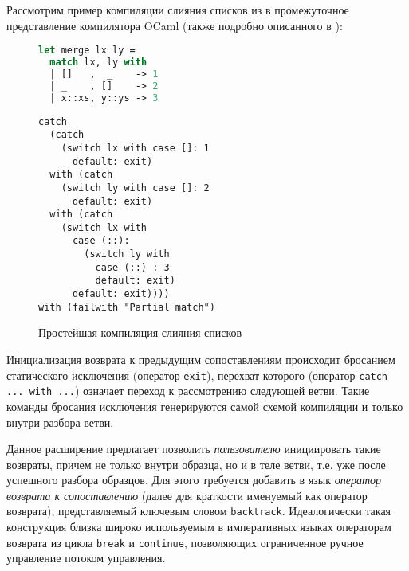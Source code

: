 Рассмотрим пример компиляции слияния списков из \cite{fessant2001optimizing} в промежуточное представление компилятора OCaml (также подробно описанного в \cite{fessant2001optimizing}):

\noindent
\begin{minipage}{\textwidth}
  \begin{figure}[H]
    \begin{minipage}{0.40\textwidth}
\begin{lstlisting}[language=ocaml]
let merge lx ly = 
  match lx, ly with
  | []   ,  _    -> 1
  | _    , []    -> 2
  | x::xs, y::ys -> 3
\end{lstlisting}
    \end{minipage}
  \centering
    \begin{minipage}{0.55\textwidth}
\begin{lstlisting}[language=lambda]
catch
  (catch
    (switch lx with case []: 1
      default: exit)
  with (catch
    (switch ly with case []: 2
      default: exit)
  with (catch
    (switch lx with
      case (::):
        (switch ly with
          case (::) : 3
          default: exit)
      default: exit))))
with (failwith "Partial match")
\end{lstlisting}
    \end{minipage}
    
  \captionsetup{justification=centering}
  \caption{Простейшая компиляция слияния списков}
  \label{fig:simple_match}
  \end{figure}
\end{minipage}

\bigskip

Инициализация возврата к предыдущим сопоставлениям происходит бросанием статического исключения (оператор \lstinline|exit|), перехват которого (оператор \lstinline[language=none,breaklines]|catch ... with ...|) означает переход к рассмотрению следующей ветви. Такие команды бросания исключения генерируются самой схемой компиляции и только внутри разбора ветви.

Данное расширение предлагает позволить \textit{пользователю} инициировать такие возвраты, причем не только внутри образца, но и в теле ветви, т.е. уже после успешного разбора образцов. Для этого требуется добавить в язык \textit{оператор возврата к сопоставлению} (далее для краткости именуемый как оператор возврата), представляемый ключевым словом \lstinline|backtrack|. Идеалогически такая конструкция близка широко используемым в императивных языках операторам возврата из цикла \lstinline|break| и \lstinline|continue|, позволяющих ограниченное ручное управление потоком управления. 

